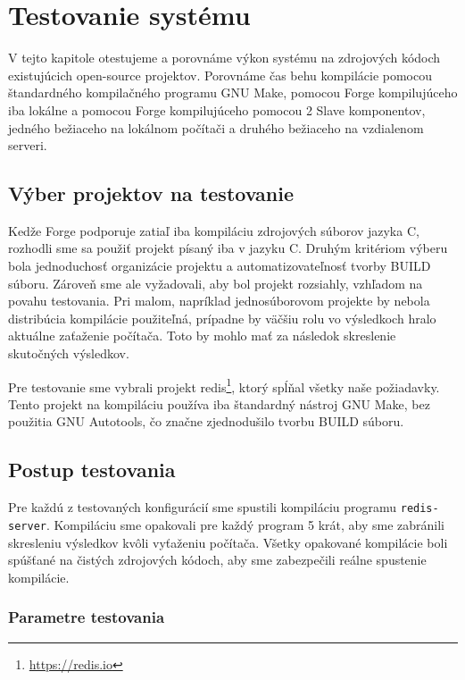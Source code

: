 \chapter{Testovanie syst\'{e}mu}
\label{ch:comp}

V tejto kapitole otestujeme a porovnáme výkon systému na zdrojových kódoch
existujúcich open-source projektov. Porovnáme čas behu kompilácie pomocou štandardného
kompilačného programu GNU Make, pomocou Forge kompilujúceho iba lokálne a pomocou
Forge kompilujúceho pomocou 2 Slave komponentov, jedného bežiaceho na lokálnom počítači
a druhého bežiaceho na vzdialenom serveri.

\section{V\'{y}ber projektov na testovanie}
\label{sec:projectchoice}

Kedže Forge podporuje zatiaľ iba kompiláciu zdrojových súborov jazyka C, rozhodli
sme sa použiť projekt písaný iba v jazyku C. Druhým kritériom výberu bola jednoduchosť
organizácie projektu a automatizovateľnosť tvorby BUILD súboru. Zároveň sme ale
vyžadovali, aby bol projekt rozsiahly, vzhľadom na povahu testovania. Pri
malom, napríklad jednosúborovom projekte by nebola distribúcia kompilácie použiteľná,
prípadne by väčšiu rolu vo výsledkoch hralo aktuálne zaťaženie počítača. Toto by
mohlo mať za následok skreslenie skutočných výsledkov.

Pre testovanie sme vybrali projekt redis\footnote{\url{https://redis.io}}, ktorý
spĺňal všetky naše požiadavky. Tento projekt na kompiláciu používa iba štandardný
nástroj GNU Make, bez použitia GNU Autotools, čo značne zjednodušilo tvorbu BUILD
súboru.

\section{Postup testovania}
\label{sec:process}

Pre každú z testovaných konfigurácií sme spustili kompiláciu programu \texttt{redis-server}.
Kompiláciu sme opakovali pre každý program 5 krát, aby sme zabránili skresleniu výsledkov
kvôli vyťaženiu počítača. Všetky opakované kompilácie boli spúšťané na čistých zdrojových
kódoch, aby sme zabezpečili reálne spustenie kompilácie.

\subsection{Parametre testovania}
\label{sec:process:params}

